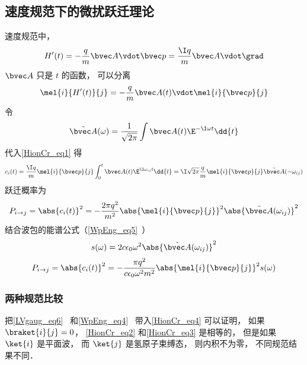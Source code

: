 \subsection{速度规范下的微扰跃迁理论}
速度规范中，
\begin{equation}
H'(t) = -\frac{q}{m}\bvec A \vdot \bvec p = \frac{\I q}{m}\bvec A \vdot \grad
\end{equation}
$\bvec A$ 只是 $t$ 的函数， 可以分离
\begin{equation}
\mel{i}{H'(t)}{j} = -\frac{q}{m}\bvec A(t) \vdot \mel{i}{\bvec p}{j}
\end{equation}
令
\begin{equation}
\tilde {\bvec A}(\omega) = \frac{1}{\sqrt{2\pi}} \int \bvec A(t) \E^{-\I\omega t} \dd{t}
\end{equation}
代入\autoref{HionCr_eq1} 得
\begin{equation}\label{HionCr_eq4}
c_i(t) = \frac{\I q}{m} \mel{i}{\bvec p}{j} \int_0^t  \bvec A(t) \E^{\I\omega_{ij} t} \dd{t} = \I\sqrt{2\pi}\frac{q}{m} \mel{i}{\bvec p}{j} \tilde {\bvec A}(-\omega_{ij})
\end{equation}
跃迁概率为
\begin{equation}\label{HionCr_eq3}
P_{i\to j} = \abs{c_i(t)}^2 = -\frac{2\pi q^2}{m^2} \abs{\mel{i}{\bvec p}{j}}^2 \abs{\tilde {\bvec A}(\omega_{ij})}^2
\end{equation}
结合波包的能谱公式（\autoref{WpEng_eq5}~）
\begin{equation}
s(\omega) = 2c\epsilon_0 \omega^2 \abs{\tilde {\bvec A}(\omega_{ij})}^2
\end{equation}
\begin{equation}
P_{i\to j} = \abs{c_i(t)}^2 = -\frac{\pi q^2}{c\epsilon_0 \omega^2 m^2} \abs{\mel{i}{\bvec p}{j}}^2 s(\omega)
\end{equation}

\subsubsection{两种规范比较}
把\autoref{LVgaug_eq6}~ 和\autoref{WpEng_eq4}~ 带入\autoref{HionCr_eq4} 可以证明， 如果 $\braket{i}{j} = 0$， \autoref{HionCr_eq2} 和\autoref{HionCr_eq3} 是相等的， 但是如果 $\ket{i}$ 是平面波， 而 $\ket{j}$ 是氢原子束缚态， 则内积不为零， 不同规范结果不同．
